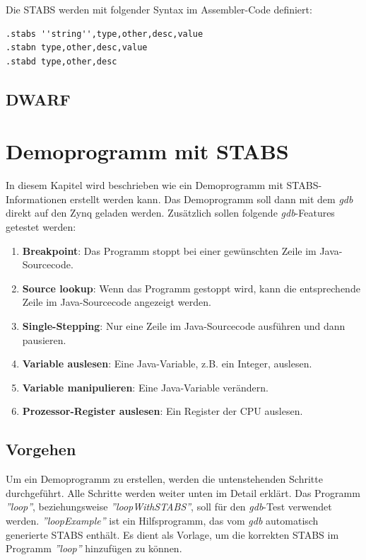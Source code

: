 Die STABS werden mit folgender Syntax im Assembler-Code definiert:\\
\lstset{language=plain}
\begin{lstlisting}
.stabs ''string'',type,other,desc,value
.stabn type,other,desc,value
.stabd type,other,desc
\end{lstlisting}



\subsection{DWARF}


\section{Demoprogramm mit STABS}
\label{section:demoprogrammSTABS}
In diesem Kapitel wird beschrieben wie ein Demoprogramm mit STABS-Informationen erstellt werden kann.
Das Demoprogramm soll dann mit dem \textit{gdb} direkt auf den Zynq geladen werden.
Zusätzlich sollen folgende \textit{gdb}-Features getestet werden:\\
\begin{enumerate}
	\item \textbf{Breakpoint}: Das Programm stoppt bei einer gewünschten Zeile im Java-Sourcecode.
	\item \textbf{Source lookup}: Wenn das Programm gestoppt wird, kann die entsprechende Zeile im Java-Sourcecode angezeigt werden.
	\item \textbf{Single-Stepping}: Nur eine Zeile im Java-Sourcecode ausführen und dann pausieren.
	\item \textbf{Variable auslesen}: Eine Java-Variable, z.B. ein Integer, auslesen.
	\item \textbf{Variable manipulieren}: Eine Java-Variable verändern.
	\item \textbf{Prozessor-Register auslesen}: Ein Register der CPU auslesen.
\end{enumerate}


\subsection{Vorgehen}
Um ein Demoprogramm zu erstellen, werden die untenstehenden Schritte durchgeführt.
Alle Schritte werden weiter unten im Detail erklärt.
Das Programm \textit{''loop''}, beziehungsweise \textit{''loopWithSTABS''}, soll für den \textit{gdb}-Test verwendet werden.
\textit{''loopExample''} ist ein Hilfsprogramm, das vom \textit{gdb} automatisch generierte STABS enthält.
Es dient als Vorlage, um die korrekten STABS im Programm \textit{''loop''} hinzufügen zu können.


